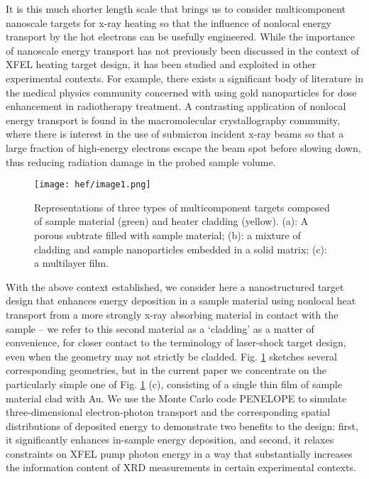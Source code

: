 It is this much shorter length scale that brings us to consider
multicomponent nanoscale targets for x-ray heating so that the influence
of nonlocal energy transport by the hot electrons can be usefully
engineered. While the importance of nanoscale energy transport has not
previously been discussed in the context of XFEL heating target design,
it has been studied and exploited in other experimental contexts. For
example, there exists a significant body of literature in the medical
physics community concerned with using gold nanoparticles for dose
enhancement in radiotherapy treatment. \cite{lee2012geometry, leung2011irradiation} A contrasting
application of nonlocal energy transport is found in the macromolecular
crystallography community, where there is interest in the use of
submicron incident x-ray beams so that a large fraction of high-energy
electrons escape the beam spot before slowing down, thus reducing
radiation damage in the probed sample volume. \cite{stern2009reducing, finfrock2013mitigation, finfrock2010spatial, nave2005towards, sanishvili2011radiation}

\begin{figure}[h]
\caption{
Representations of three types of multicomponent
targets composed of sample material (green) and heater cladding
(yellow). (a): A porous subtrate filled with sample material; (b): a
mixture of cladding and sample nanoparticles embedded in a solid matrix;
(c): a multilayer film.
}
\label{fig:hef_image1}
\centering
\texttt{[image: hef/image1.png]}
\end{figure}

With the above context established, we consider here a nanostructured
target design that enhances energy deposition in a sample material using
nonlocal heat transport from a more strongly x-ray absorbing material in
contact with the sample -- we refer to this second material as a
`cladding' as a matter of convenience, for closer contact to the
terminology of laser-shock target design, even when the geometry may not
strictly be cladded. Fig. \ref{fig:hef_image1} sketches several corresponding geometries,
but in the current paper we concentrate on the particularly simple one
of Fig. \ref{fig:hef_image1} (c), consisting of a single thin film of sample material clad
with Au. We use the Monte Carlo code PENELOPE to simulate
three-dimensional electron-photon transport and the corresponding
spatial distributions of deposited energy to demonstrate two benefits to
the design: first, it significantly enhances in-sample energy
deposition, and second, it relaxes constraints on XFEL pump photon
energy in a way that substantially increases the information content of
XRD measurements in certain experimental contexts.

